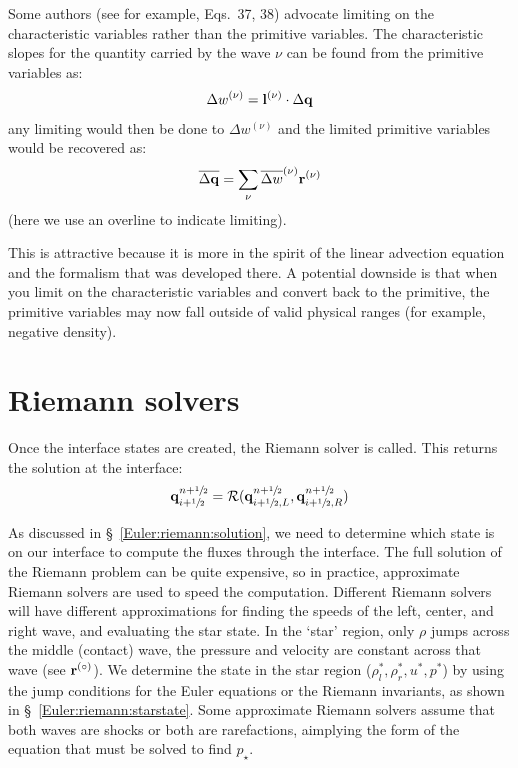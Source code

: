 Some authors (see for example, \cite{athena} Eqs.~37, 38) advocate
limiting on the characteristic variables rather than the primitive
variables.  The characteristic slopes for the quantity carried by the
wave $\nu$ can be found from the primitive variables
as: 
%
\begin{equation} 
\Delta w^{(\nu)} = {\bf l}^{(\nu)} \cdot \Delta {\bf q} 
\end{equation} 
%
any limiting would then be done to $\Delta w^{(\nu)}$ and the limited
primitive variables would be recovered as:
\begin{equation}
  \overline{\Delta {\bf q}} = \sum_\nu \overline{\Delta w}^{(\nu)}
  {\bf r}^{(\nu)} 
\end{equation} 
(here we use an overline to indicate limiting).

This is attractive because it is more in the spirit of the linear
advection equation and the formalism that was developed there.  A
potential downside is that when you limit on the characteristic
variables and convert back to the primitive, the primitive variables
may now fall outside of valid physical ranges (for example, negative
density).



\section{Riemann solvers}


Once the interface states are created, the Riemann solver is called.  This
returns the solution at the interface:
\begin{equation}
{\bf q}_{i+{\sfrac{1}{2}}}^{n+{\sfrac{1}{2}}} = \mathcal{R}({\bf q}_{i+{\sfrac{1}{2}},L}^{n+{\sfrac{1}{2}}}, {\bf q}_{i+{\sfrac{1}{2}},R}^{n+{\sfrac{1}{2}}})
\end{equation}

As discussed in \S~\ref{Euler:riemann:solution}, we need to determine
which state is on our interface to compute the fluxes through the
interface.  The full solution of the Riemann problem can be quite expensive,
so in practice, approximate Riemann solvers are used to speed
the computation.  Different Riemann solvers
will have different approximations for finding the speeds of the left,
center, and right wave, and evaluating the star state.  In the `star'
region, only $\rho$ jumps across the middle (contact) wave, the
pressure and velocity are constant across that wave (see ${\bf r}^{(\circ)}$).
We determine the state in the star region ($\rho_l^*, \rho_r^*, u^*,
p^*$) by using the jump conditions for the Euler equations or the
Riemann invariants, as shown in \S~\ref{Euler:riemann:starstate}.
Some approximate Riemann solvers assume that both waves are shocks or
both are rarefactions, aimplying the form of the equation that
must be solved to find $p_\star$.

